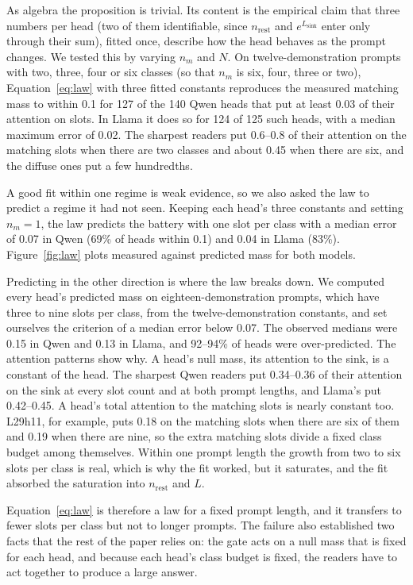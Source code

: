 \documentclass{article}
\newcommand{\head}[2]{L#1h#2}
\begin{document}
As algebra the proposition is trivial. Its content is the empirical claim that three numbers per head (two of them identifiable, since $n_{\mathrm{rest}}$ and $e^{L_{\mathrm{sink}}}$ enter only through their sum), fitted once, describe how the head behaves as the prompt changes. We tested this by varying $n_m$ and $N$. On twelve-demonstration prompts with two, three, four or six classes (so that $n_m$ is six, four, three or two), Equation~\ref{eq:law} with three fitted constants reproduces the measured matching mass to within 0.1 for 127 of the 140 Qwen heads that put at least 0.03 of their attention on slots. In Llama it does so for 124 of 125 such heads, with a median maximum error of 0.02. The sharpest readers put 0.6--0.8 of their attention on the matching slots when there are two classes and about 0.45 when there are six, and the diffuse ones put a few hundredths.

A good fit within one regime is weak evidence, so we also asked the law to predict a regime it had not seen. Keeping each head's three constants and setting $n_m = 1$, the law predicts the battery with one slot per class with a median error of 0.07 in Qwen (69\% of heads within 0.1) and 0.04 in Llama (83\%). Figure~\ref{fig:law} plots measured against predicted mass for both models.

Predicting in the other direction is where the law breaks down. We computed every head's predicted mass on eighteen-demonstration prompts, which have three to nine slots per class, from the twelve-demonstration constants, and set ourselves the criterion of a median error below 0.07. The observed medians were 0.15 in Qwen and 0.13 in Llama, and 92--94\% of heads were over-predicted. The attention patterns show why. A head's null mass, its attention to the sink, is a constant of the head. The sharpest Qwen readers put 0.34--0.36 of their attention on the sink at every slot count and at both prompt lengths, and Llama's put 0.42--0.45. A head's total attention to the matching slots is nearly constant too. \head{29}{11}, for example, puts 0.18 on the matching slots when there are six of them and 0.19 when there are nine, so the extra matching slots divide a fixed class budget among themselves. Within one prompt length the growth from two to six slots per class is real, which is why the fit worked, but it saturates, and the fit absorbed the saturation into $n_{\mathrm{rest}}$ and $L$.

Equation~\ref{eq:law} is therefore a law for a fixed prompt length, and it transfers to fewer slots per class but not to longer prompts. The failure also established two facts that the rest of the paper relies on: the gate acts on a null mass that is fixed for each head, and because each head's class budget is fixed, the readers have to act together to produce a large answer.
\end{document}

